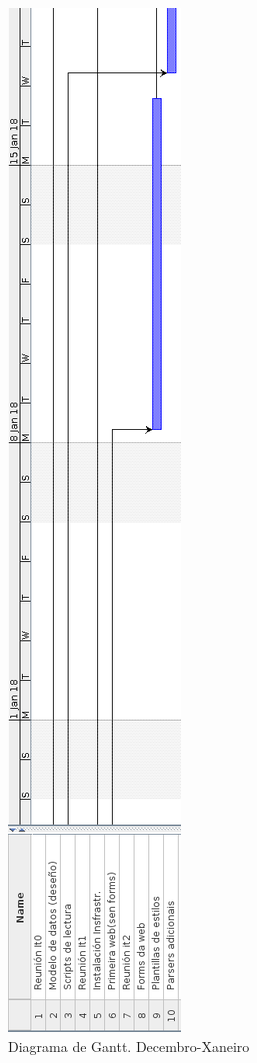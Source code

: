 \begin{figure}[H]
	\centering
	\includegraphics[scale=0.45,keepaspectratio=true]{./images/gantt/g3.png}
	\caption{Diagrama de Gantt. Decembro-Xaneiro}
\end{figure}

